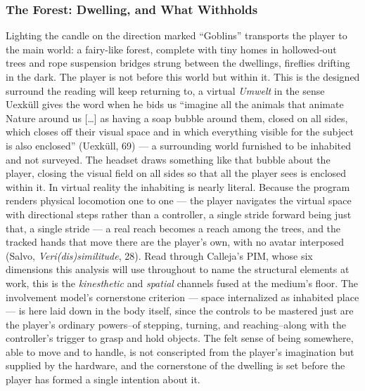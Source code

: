 \documentclass{article}
\begin{document}
\subsubsection*{The Forest: Dwelling, and What Withholds}

Lighting the candle on the direction marked ``Goblins'' transports the player to the main world: a fairy-like forest, complete with tiny homes in hollowed-out trees and rope suspension bridges strung between the dwellings, fireflies drifting in the dark. The player is not before this world but within it. This is the designed surround the reading will keep returning to, a virtual \textit{Umwelt} in the sense Uexküll gives the word when he bids us ``imagine all the animals that animate Nature around us [\ldots] as having a soap bubble around them, closed on all sides, which closes off their visual space and in which everything visible for the subject is also enclosed'' (Uexküll, 69) — a surrounding world furnished to be inhabited and not surveyed. The headset draws something like that bubble about the player, closing the visual field on all sides so that all the player sees is enclosed within it. In virtual reality the inhabiting is nearly literal. Because the program renders physical locomotion one to one — the player navigates the virtual space with directional steps rather than a controller, a single stride forward being just that, a single stride — a real reach becomes a reach among the trees, and the tracked hands that move there are the player's own, with no avatar interposed (Salvo, \textit{Veri(dis)similitude}, 28). Read through Calleja's PIM, whose six dimensions this analysis will use throughout to name the structural elements at work, this is the \textit{kinesthetic} and \textit{spatial} channels fused at the medium's floor. The involvement model's cornerstone criterion — space internalized as inhabited place — is here laid down in the body itself, since the controls to be mastered just are the player's ordinary powers--of stepping, turning, and reaching--along with the controller's trigger to grasp and hold objects. The felt sense of being somewhere, able to move and to handle, is not conscripted from the player's imagination but supplied by the hardware, and the cornerstone of the dwelling is set before the player has formed a single intention about it.
\end{document}
